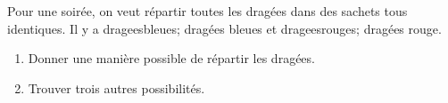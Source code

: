 \documentclass[exercice]{thedocument}%
\begin{document}
%
Pour une soirée, on veut répartir toutes les dragées dans des sachets tous identiques. Il y a \<drageesbleues;
dragées bleues et \<drageesrouges; dragées rouge.
\begin{enumerate}
    \item Donner une manière possible de répartir les dragées.
    \item Trouver trois autres possibilités.
\end{enumerate}
\end{document}
